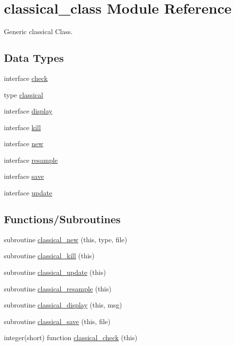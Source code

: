 \hypertarget{namespaceclassical__class}{}\section{classical\+\_\+class Module Reference}
\label{namespaceclassical__class}


Generic classical Class.  


\subsection*{Data Types}
\begin{DoxyCompactItemize}
\item 
interface \hyperlink{interfaceclassical__class_1_1check}{check}
\item 
type \hyperlink{structclassical__class_1_1classical}{classical}
\item 
interface \hyperlink{interfaceclassical__class_1_1display}{display}
\item 
interface \hyperlink{interfaceclassical__class_1_1kill}{kill}
\item 
interface \hyperlink{interfaceclassical__class_1_1new}{new}
\item 
interface \hyperlink{interfaceclassical__class_1_1resample}{resample}
\item 
interface \hyperlink{interfaceclassical__class_1_1save}{save}
\item 
interface \hyperlink{interfaceclassical__class_1_1update}{update}
\end{DoxyCompactItemize}
\subsection*{Functions/\+Subroutines}
\begin{DoxyCompactItemize}
\item 
subroutine \hyperlink{namespaceclassical__class_a6e5dda0e17a3e5cb552a289231d488fd}{classical\+\_\+new} (this, type, file)
\item 
subroutine \hyperlink{namespaceclassical__class_a88946a9bda2bac6d08860b7d96cf5219}{classical\+\_\+kill} (this)
\item 
subroutine \hyperlink{namespaceclassical__class_afb802bbd3f8834f449275a0bdab55677}{classical\+\_\+update} (this)
\item 
subroutine \hyperlink{namespaceclassical__class_a9b5ff74fe77b1370f4ca34d3bb3783c9}{classical\+\_\+resample} (this)
\item 
subroutine \hyperlink{namespaceclassical__class_ac2d45f3adc9cbe9dcf22b9905ba1f649}{classical\+\_\+display} (this, msg)
\item 
subroutine \hyperlink{namespaceclassical__class_a961b68acb4e6f345ae596a8424866657}{classical\+\_\+save} (this, file)
\item 
integer(short) function \hyperlink{namespaceclassical__class_ab91ea3d44c25f7d544b297e0b1a4f00a}{classical\+\_\+check} (this)
\end{DoxyCompactItemize}


